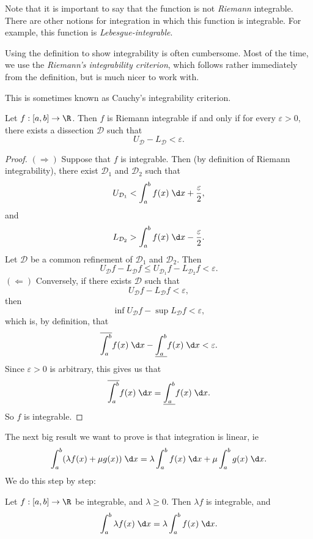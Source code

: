 \documentclass[a4paper]{article}
\begin{document}
Note that it is important to say that the function is not \emph{Riemann} integrable. There are other notions for integration in which this function is integrable. For example, this function is \emph{Lebesgue-integrable}.

Using the definition to show integrability is often cumbersome. Most of the time, we use the \emph{Riemann's integrability criterion}, which follows rather immediately from the definition, but is much nicer to work with.
\begin{prop}
  This is sometimes known as Cauchy's integrability criterion.

  Let $f: [a, b] \to \R$. Then $f$ is Riemann integrable if and only if for every $\varepsilon > 0$, there exists a dissection $\mathcal{D}$ such that
  \[
    U_\mathcal{D} - L_\mathcal{D} < \varepsilon.
  \]
\end{prop}

\begin{proof}
  $(\Rightarrow)$ Suppose that $f$ is integrable. Then (by definition of Riemann integrability), there exist $\mathcal{D}_1$ and $\mathcal{D}_2$ such that
  \[
    U_{\mathcal{D}_1} < \int_a^b f(x)\;\d x + \frac{\varepsilon}{2},
  \]
  and
  \[
    L_{\mathcal{D}_2} > \int_a^b f(x)\;\d x - \frac{\varepsilon}{2}.
  \]
  Let $\mathcal{D}$ be a common refinement of $\mathcal{D}_1$ and $\mathcal{D}_2$. Then
  \[
    U_\mathcal{D} f - L_\mathcal{D} f \leq U_{\mathcal{D}_1} f- L_{\mathcal{D}_2} f < \varepsilon.
  \]
  $(\Leftarrow)$ Conversely, if there exists $\mathcal{D}$ such that
  \[
    U_\mathcal{D} f - L_\mathcal{D}f < \varepsilon,
  \]
  then
  \[
    \inf U_\mathcal{D} f - \sup L_\mathcal{D} f < \varepsilon,
  \]
  which is, by definition, that
  \[
    \overline{\int_a^b} f(x)\;\d x - \underline{\int_a^b} f(x)\;\d x < \varepsilon.
  \]
  Since $\varepsilon > 0$ is arbitrary, this gives us that
  \[
    \overline{\int_a^b} f(x)\;\d x = \underline{\int_a^b} f(x)\;\d x.
  \]
  So $f$ is integrable.
\end{proof}

The next big result we want to prove is that integration is linear, ie
\[
  \int_a^b (\lambda f(x) + \mu g(x))\;\d x = \lambda\int_a^b f(x)\;\d x + \mu\int_a^bg(x)\;\d x.
\]
We do this step by step:
\begin{prop}
  Let $f: [a, b] \to \R$ be integrable, and $\lambda \geq 0$. Then $\lambda f$ is integrable, and
  \[
    \int_a^b \lambda f(x)\;\d x = \lambda\int_a^b f(x)\;\d x.
  \]
\end{prop}
\end{document}

